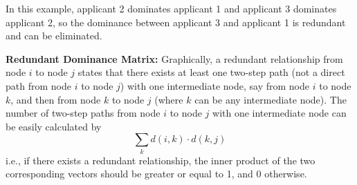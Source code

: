 \documentclass[12pt,english]{report}
\begin{document}
\begin{figure}
	\begin{floatrow}
	\capbtabbox{%
		\begin{tabular}{l|llllll}
			& 1 & 2 & 3 & 4 & 5 & 6 \\ \hline
			1 & 0 & 0 & 0 & 0 & 0 & 0 \\
			2 & 1 & 0 & 0 & 1 & 1 & 0 \\
			3 & 1 & 1 & 0 & 1 & 1 & 0 \\
			4 & 0 & 0 & 0 & 0 & 0 & 0 \\
			5 & 0 & 0 & 0 & 0 & 0 & 0 \\
			6 & 1 & 1 & 0 & 1 & 1 & 0 \\
		\end{tabular}%
	}{%
	\caption{Full Dominance relation in Matrix Form}%
	\label{full_domin}
}
\end{floatrow}
\end{figure}









In this example, applicant 2 dominates applicant 1 and applicant 3 dominates
applicant 
2, so the dominance between applicant 3 and applicant 1 is redundant and can be
eliminated.

\vspace{0.1in}
\textbf{Redundant Dominance Matrix:}  Graphically, a redundant relationship
from node 
$i$ to node $j$ states that there exists at least one two-step path (not a
direct path
from node $i$ to node $j$) with one intermediate node, say from node $i$ to
node $k$, 
and then from node $k$ to node $j$ (where $k$ can be any intermediate node). 
The number
of two-step paths from node $i$ to node $j$ with one intermediate node can be
easily
calculated by $$ \sum_k d(i,k) \cdot  d(k,j)$$
i.e., if there exists a redundant relationship, the inner product of the two
corresponding vectors should be greater or equal to 1, and 0 otherwise.
\end{document}
